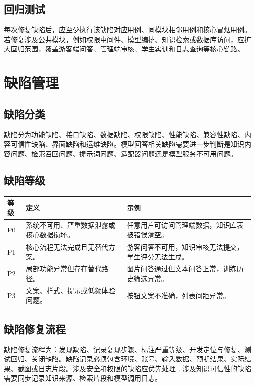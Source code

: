 \subsection{回归测试}

每次修复缺陷后，应至少执行该缺陷对应用例、同模块相邻用例和核心冒烟用例。若修复涉及公共模块，例如权限中间件、模型编排、知识检索或数据库访问，应扩大回归范围，覆盖游客端问答、管理端审核、学生实训和日志查询等核心链路。

\section{缺陷管理}

\subsection{缺陷分类}

缺陷分为功能缺陷、接口缺陷、数据缺陷、权限缺陷、性能缺陷、兼容性缺陷、内容可信性缺陷、界面缺陷和运维缺陷。模型回答相关缺陷需要进一步判断是知识内容问题、检索召回问题、提示词问题、适配器问题还是模型服务不可用问题。

\subsection{缺陷等级}

\begin{longtable}{p{1.5cm}p{5.0cm}p{6.7cm}}
\toprule
等级 & 定义 & 示例 \\
\midrule
P0 & 系统不可用、严重数据泄露或核心数据损坏。 & 任意用户可访问管理端数据，知识库表被错误清空。 \\
P1 & 核心流程无法完成且无替代方案。 & 游客问答不可用，知识审核无法提交，学生评分无法生成。 \\
P2 & 局部功能异常但存在替代路径。 & 图片问答通过但文本问答正常，训练历史筛选异常。 \\
P3 & 文案、样式、提示或低频体验问题。 & 按钮文案不准确，列表间距异常。 \\
\bottomrule
\end{longtable}

\subsection{缺陷修复流程}

缺陷修复流程为：发现缺陷、记录复现步骤、标注严重等级、开发定位与修复、测试回归、关闭缺陷。缺陷记录必须包含环境、账号、输入数据、预期结果、实际结果、截图或日志片段。涉及安全和权限的缺陷应优先处理；涉及知识可信性的缺陷需要同步记录知识来源、检索片段和模型调用日志。

